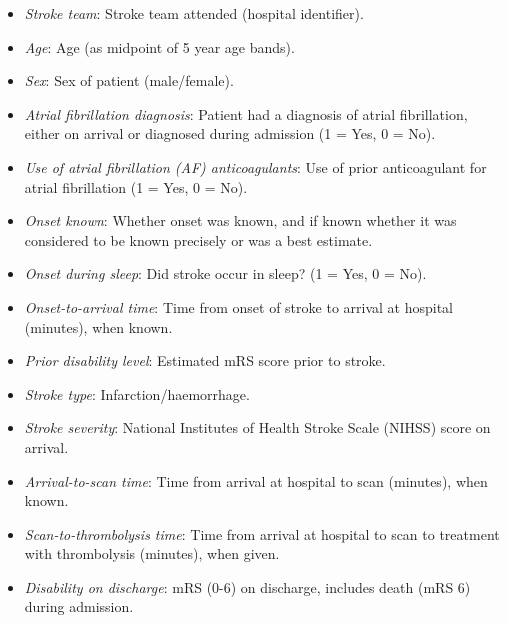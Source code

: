 \begin{itemize}

    \item \textit{Stroke team}: Stroke team attended (hospital identifier).

    \item \textit{Age}: Age (as midpoint of 5 year age bands).

    \item \textit{Sex}: Sex of patient (male/female).

    \item \textit{Atrial fibrillation diagnosis}: Patient had a diagnosis of atrial fibrillation, either on arrival or diagnosed during admission (1 = Yes, 0 = No).

    \item \textit{Use of atrial fibrillation (AF) anticoagulants}: Use of prior anticoagulant for atrial fibrillation (1 = Yes, 0 = No).

    \item \textit{Onset known}: Whether onset was known, and if known whether it was considered to be known precisely or was a best estimate.

    \item \textit{Onset during sleep}: Did stroke occur in sleep? (1 = Yes, 0 = No).

    \item \textit{Onset-to-arrival time}: Time from onset of stroke to arrival at hospital (minutes), when known.

    \item \textit{Prior disability level}: Estimated mRS score prior to stroke.

    \item \textit{Stroke type}: Infarction/haemorrhage.

    \item \textit{Stroke severity}: National Institutes of Health Stroke Scale (NIHSS) score on arrival.

    \item \textit{Arrival-to-scan time}: Time from arrival at hospital to scan (minutes), when known.

    \item \textit{Scan-to-thrombolysis time}: Time from arrival at hospital to scan to treatment with thrombolysis (minutes), when given.

    \item \textit{Disability on discharge}: mRS (0-6) on discharge, includes death (mRS 6) during admission.
    
\end{itemize}

